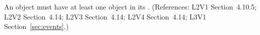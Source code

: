 An \Event object must have at least one \EventAssignment object in its
.  (References: L2V1 Section~4.10.5; L2V2
Section~4.14; L2V3 Section~4.14; L2V4 Section~4.14; L3V1 Section~\ref{sec:events}.)

